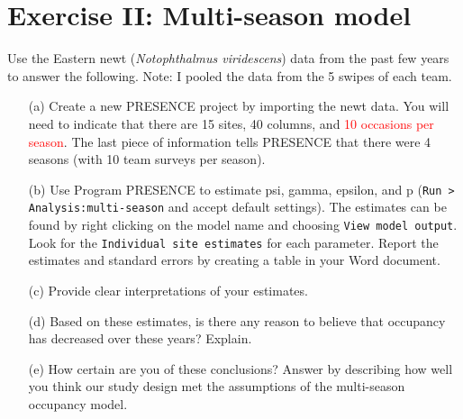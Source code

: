 \documentclass[12pt]{article}\usepackage[]{graphicx}\usepackage[]{color}
\begin{document}
\clearpage

\section*{Exercise II: Multi-season model}

Use the Eastern newt ({\it Notophthalmus viridescens}) data from the
past few years to answer the following. Note: I pooled the data from
the 5 swipes of each team.   

\begin{enumerate}
  \item[(a)] Create a new PRESENCE project by importing the newt
    data. You will need to indicate that there are 15 sites, 40
    columns, and \textcolor{red}{10 occasions per season}. The last piece of
    information tells PRESENCE that there were 4 seasons (with 10 team
    surveys per season).  
  \item[(b)] Use Program PRESENCE to estimate psi, gamma, epsilon,
    and p (\texttt{Run > Analysis:multi-season} and accept default
    settings). The estimates can be found by right clicking on the
    model name and choosing \texttt{View model output}. Look for the 
    \texttt{Individual site estimates} for each parameter. Report the
    estimates and standard errors by creating a table in your Word
    document.  
  \item[(c)] Provide clear interpretations of your estimates. 
  \item[(d)] Based on these estimates, is there any reason to believe
    that occupancy has decreased over these years? Explain. 
  \item[(e)] How certain are you of these conclusions? Answer by
    describing how well you think our study design met the assumptions
    of the multi-season occupancy model. 

\end{enumerate}





\end{document}
